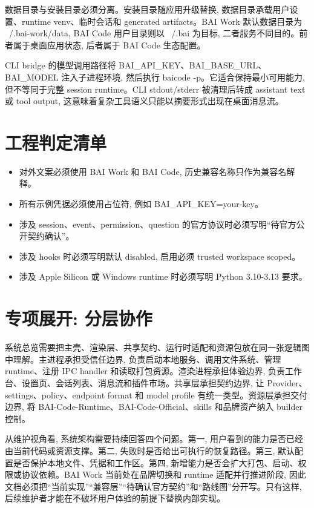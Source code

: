 数据目录与安装目录必须分离。安装目录随应用升级替换, 数据目录承载用户设置、runtime venv、临时会话和 generated artifacts。BAI Work 默认数据目录为 ~/.bai-work/data, BAI Code 用户目录则以 ~/.bai 为目标, 二者服务不同目的。前者属于桌面应用状态, 后者属于 BAI Code 生态配置。

CLI bridge 的模型调用路径将 BAI\_API\_KEY、BAI\_BASE\_URL、BAI\_MODEL 注入子进程环境, 然后执行 baicode -p。它适合保持最小可用能力, 但不等同于完整 session runtime。CLI stdout/stderr 被清理后转成 assistant text 或 tool output, 这意味着复杂工具语义只能以摘要形式出现在桌面消息流。

\section{工程判定清单}
\begin{itemize}
  \item 对外文案必须使用 BAI Work 和 BAI Code, 历史兼容名称只作为兼容名解释。
  \item 所有示例凭据必须使用占位符, 例如 BAI\_API\_KEY=your-key。
  \item 涉及 session、event、permission、question 的官方协议时必须写明“待官方公开契约确认”。
  \item 涉及 hooks 时必须写明默认 disabled, 启用必须 trusted workspace scoped。
  \item 涉及 Apple Silicon 或 Windows runtime 时必须写明 Python 3.10-3.13 要求。
\end{itemize}

\section{专项展开: 分层协作}
系统总览需要把主壳、渲染层、共享契约、运行时适配和资源包放在同一张逻辑图中理解。主进程承担受信任边界, 负责启动本地服务、调用文件系统、管理 runtime、注册 IPC handler 和读取打包资源。渲染进程承担体验边界, 负责工作台、设置页、会话列表、消息流和插件市场。共享层承担契约边界, 让 Provider、settings、policy、endpoint format 和 model profile 有统一类型。资源层承担交付边界, 将 BAI-Code-Runtime、BAI-Code-Official、skills 和品牌资产纳入 builder 控制。

从维护视角看, 系统架构需要持续回答四个问题。第一, 用户看到的能力是否已经由当前代码或资源支撑。第二, 失败时是否给出可执行的恢复路径。第三, 默认配置是否保护本地文件、凭据和工作区。第四, 新增能力是否会扩大打包、启动、权限或协议依赖。BAI Work 当前处在品牌切换和 runtime 适配并行推进阶段, 因此文档必须把“当前实现”“兼容层”“待确认官方契约”和“路线图”分开写。只有这样, 后续维护者才能在不破坏用户体验的前提下替换内部实现。

